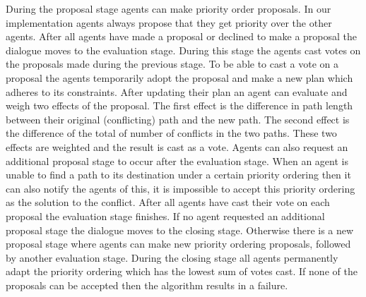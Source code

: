 During the proposal stage agents can make priority order proposals. In our
implementation agents always propose that they get priority over the other
agents. After all agents have made a proposal or declined to make a proposal
the dialogue moves to the evaluation stage. During this stage the agents cast
votes on the proposals made during the previous stage. To be able to cast a
vote on a proposal the agents temporarily adopt the proposal and make a new
plan which adheres to its constraints. After updating their plan an agent can
evaluate and weigh two effects of the proposal. The first effect is the
difference in path length between their original (conflicting) path and the new
path. The second effect is the difference of the total of number of conflicts
in the two paths. These two effects are weighted and the result is cast as a
vote. Agents can also request an additional proposal stage to occur after the
evaluation stage. When an agent is unable to find a path to its destination
under a certain priority ordering then it can also notify the agents of this,
it is impossible to accept this priority ordering as the solution to the
conflict. After all agents have cast their vote on each proposal the evaluation
stage finishes. If no agent requested an additional proposal stage the dialogue
moves to the closing stage. Otherwise there is a new proposal stage where
agents can make new priority ordering proposals, followed by another evaluation
stage. During the closing stage all agents permanently adapt the priority
ordering which has the lowest sum of votes cast. If none of the proposals can
be accepted then the algorithm results in a failure.


